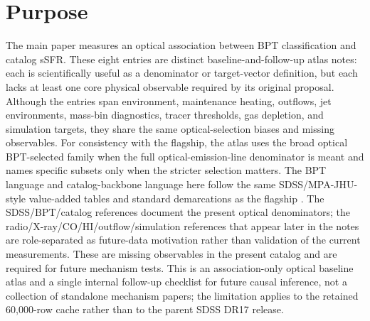 \documentclass[twocolumn]{aastex631}
\begin{document}

\section{Purpose}
The main paper measures an optical association between BPT classification and catalog sSFR. These eight entries are distinct baseline-and-follow-up atlas notes: each is scientifically useful as a denominator or target-vector definition, but each lacks at least one core physical observable required by its original proposal. Although the entries span environment, maintenance heating, outflows, jet environments, mass-bin diagnostics, tracer thresholds, gas depletion, and simulation targets, they share the same optical-selection biases and missing observables. For consistency with the flagship, the atlas uses the broad optical BPT-selected family when the full optical-emission-line denominator is meant and names specific subsets only when the stricter selection matters. The BPT language and catalog-backbone language here follow the same SDSS/MPA-JHU-style value-added tables and standard demarcations as the flagship \citep{sdssdr17,brinchmann2004,york2000,baldwin1981,kewley2001,kauffmann2003bpt,kewley2006,stasinska2008,stasinska2015}. The SDSS/BPT/catalog references document the present optical denominators; the radio/X-ray/CO/HI/outflow/simulation references that appear later in the notes are role-separated as future-data motivation rather than validation of the current measurements. These are missing observables in the present catalog and are required for future mechanism tests. This is an association-only optical baseline atlas and a single internal follow-up checklist for future causal inference, not a collection of standalone mechanism papers; the limitation applies to the retained 60,000-row cache rather than to the parent SDSS DR17 release.
\end{document}
